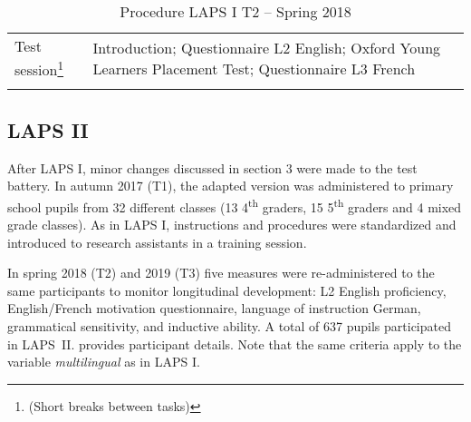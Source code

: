 \documentclass[output=paper]{langsci/langscibook}
\begin{document}
\begin{table}
\begin{tabularx}{\textwidth}{lQ}
\lsptoprule
Test session\footnote{(Short breaks between tasks)} & Introduction; Questionnaire L2 English; Oxford Young Learners Placement Test; Questionnaire L3 French\\
\lspbottomrule
\end{tabularx}
\caption{Procedure LAPS I T2 – Spring 2018\label{tab:02:4}}
\end{table}

 \subsection{LAPS II}\label{sec:02:4.5}


After LAPS I, minor changes discussed in section 3 were made to the test battery. In autumn 2017 (T1), the adapted version was administered to primary school pupils from 32 different classes (13 4\textsuperscript{th} graders, 15 5\textsuperscript{th} graders and 4 mixed grade classes). As in LAPS I, instructions and procedures were standardized and introduced to research assistants in a training session. 

In spring 2018 (T2) and 2019 (T3) five measures were re-administered to the same participants to monitor longitudinal development: L2 English proficiency, English/French motivation questionnaire, language of instruction German, grammatical sensitivity, and inductive ability. A total of 637 pupils participated in LAPS~II.  provides participant details. Note that the same criteria apply to the variable \textit{multilingual} as in LAPS I. 
\end{document}
